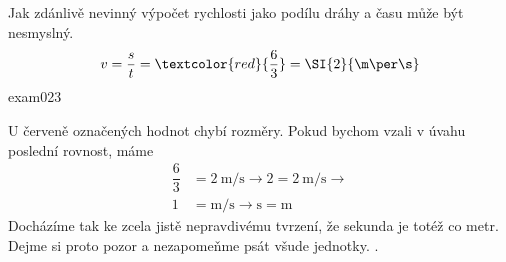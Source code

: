 \begin{fyzexam}{Jak zdánlivě nevinný výpočet rychlosti jako podílu dráhy a času může být nesmyslný.  
  \[v = \dfrac{s}{t} = \textcolor{red}{\dfrac{6}{3}} =
  \protect\SI{2}{\protect\m\protect\per\protect\s}\]}{exam023}    

  U červeně označených hodnot chybí rozměry. Pokud bychom vzali v úvahu poslední rovnost, máme
  \begin{align*}
    \dfrac{6}{3} &= \SI{2}{\m\per\s}  \rightarrow 2 = \SI{2}{\m\per\s}  \rightarrow \\
               1 &= \si{\m\per\s}     \rightarrow     \si{\s} = \si{\m} 
  \end{align*}
  Docházíme tak ke zcela jistě nepravdivému tvrzení, že sekunda je totéž co metr. Dejme si proto
  pozor a nezapomeňme psát všude jednotky. \cite[s.~1]{Kulhanek2020}. 
\end{fyzexam}
